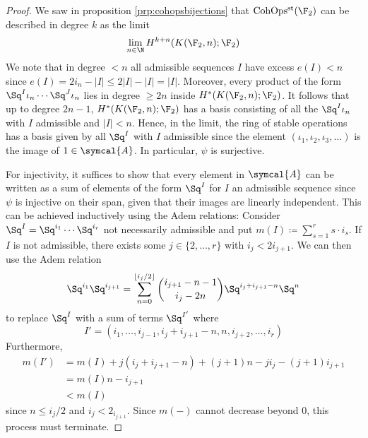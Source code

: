 \begin{proof}
	We saw in proposition \ref{prp:cohopsbijections} that $\CohOpsst(\F_2)$ can be described in degree $k$ as the limit 
	\begin{equation*}
		\lim_{n \in \N} H^{k + n}(K(\F_2, n); \F_2)
	\end{equation*}
	We note that in degree $< n$ all admissible sequences $I$ have excess $e(I) < n$ since $e(I) = 2 i_n - |I| \leq 2 |I| - |I| = |I|$.
	Moreover, every product of the form $\Sq^I \iota_n \cdots \Sq^J \iota_n$ lies in degree $\geq 2n$ inside $H^*(K(\F_2, n); \F_2)$.
	It follows that up to degree $2n - 1$, $H^*(K(\F_2, n); \F_2)$ has a basis consisting of all the $\Sq^I \iota_n$ with $I$ admissible and $|I| < n$.
	Hence, in the limit, the ring of stable operations has a basis given by all $\Sq^I$ with $I$ admissible since the element $(\iota_1, \iota_2, \iota_3, \ldots)$ is the image of $1 \in \symcal{A}$.
	In particular, $\psi$ is surjective.

	For injectivity, it suffices to show that every element in $\symcal{A}$ can be written as a sum of elements of the form $\Sq^I$ for $I$ an admissible sequence since $\psi$ is injective on their span, given that their images are linearly independent.
	This can be achieved inductively using the Adem relations:
	Consider $\Sq^I = \Sq^{i_1} \cdots \Sq^{i_r}$ not necessarily admissible and put $m(I) \coloneq \sum_{s = 1}^r s \cdot i_s$.
	If $I$ is not admissible, there exists some $j \in \{2, \ldots, r\}$ with $i_j < 2 i_{j + 1}$.
	We can then use the Adem relation
	\begin{equation*}
		\Sq^{i_1}\Sq^{i_{j + 1}} = \sum_{n = 0}^{\lfloor i_j / 2\rfloor} \binom{i_{j + 1} - n - 1}{i_j - 2n} \Sq^{i_j + i_{j + 1} - n}\Sq^n
	\end{equation*}
	to replace $\Sq^I$ with a sum of terms $\Sq^{I'}$ where
	\begin{equation*}
		I' = (i_1, \ldots, i_{j - 1}, i_j + i_{j + 1} - n, n, i_{j + 2}, \ldots, i_r)
	\end{equation*}
	Furthermore, 
	\begin{align*}
		m(I') &= m(I) + j (i_j + i_{j + 1} - n) + (j + 1) n - j i_j - (j + 1) i_{j + 1} \\
			  &= m(I) n - i_{j + 1} \\
			  &< m(I)
	\end{align*}
	since $n \leq i_j / 2$ and $i_j < 2_{i_{j + 1}}$.
	Since $m({{-}})$ cannot decrease beyond 0, this process must terminate.
\end{proof}
